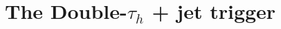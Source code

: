 \documentclass[../main.tex]{subfiles}
\begin{document}
\chapter{The Double-$\tau_h$ + jet trigger}
\end{document}
